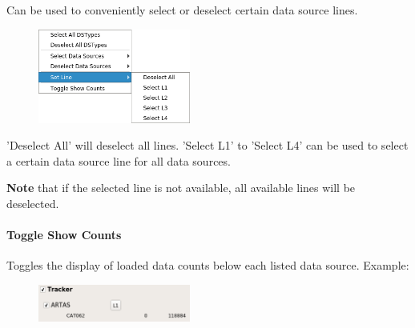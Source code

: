 Can be used to conveniently select or deselect certain data source lines.

\begin{figure}[H]
    \center
    \includegraphics[width=5cm,frame]{figures/ui_data_source_configmenu_lines.png}
\end{figure}

'Deselect All' will deselect all lines. 'Select L1' to 'Select L4' can be used to select a certain data source line for all data sources.

\textbf{Note} that if the selected line is not available, all available lines will be deselected.

\paragraph{Toggle Show Counts}

Toggles the display of loaded data counts below each listed data source. Example:

\begin{figure}[H]
    \center
    \includegraphics[width=5cm,frame]{figures/ui_data_source_configmenu_counts.png}
\end{figure}
